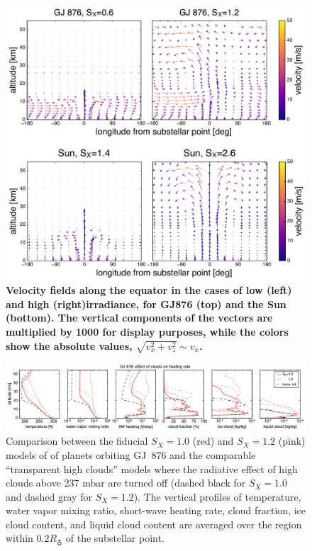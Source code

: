 \documentclass[11pt,numberedappendix,twocolappendix,]{emulateapj}
\def\wv{water vapor}
\def\revise#1{{\bf #1}}
\begin{document}
\begin{figure}[htb]
    \begin{center}
    \includegraphics[width=1\hsize]{vectormap_z_1000.pdf}
    \end{center}
\caption{\revise{Velocity fields along the equator in the cases of low (left) and high (right)irradiance, for GJ876 (top) and the Sun (bottom). The vertical components of the vectors are multiplied by 1000 for display purposes, while the colors show the absolute values, $\sqrt{v_x^2 + v_z^2} \sim  v_x$. }}
\label{fig:vectormap}
\end{figure}


\begin{figure}[htb]
    \begin{center}
    \includegraphics[width=1\hsize]{GJ876_heat_cld.pdf}
    \end{center}
\caption{Comparison between the fiducial $S_X=1.0$ (red) and $S_X=1.2$ (pink) models of of planets orbiting GJ~876 and the comparable ``transparent high clouds'' models where the radiative effect of high clouds above 237 mbar are turned off (dashed black for $S_X=1.0$ and dashed gray for $S_X=1.2$). The vertical profiles of temperature, \wv{} mixing ratio, short-wave heating rate, cloud fraction, ice cloud content, and liquid cloud content are averaged over the region within $0.2R_\earth $ of the substellar point. }
\label{fig:GJ876_heat_cld}
\end{figure}
\end{document}
